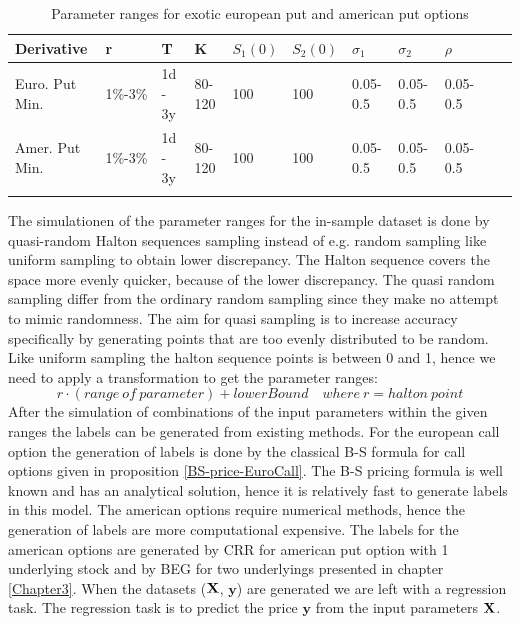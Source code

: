 \begin{table}[th]
\caption[Parameter Ranges For MLPs]{Parameter ranges for exotic european put and american put options}
\label{tab:ExoticParRange}
\centering
\begin{tabular}{l l l l l l l l l l l}
\toprule
\textbf{Derivative} & \textbf{r} & \textbf{T} & K & $S_1(0)$ & $S_2(0)$ & $\sigma_1$ & $\sigma_2$ & $\rho$ \\
\midrule
Euro. Put Min. & 1\%-3\% & 1d - 3y & 80-120 & 100 & 100 & 0.05-0.5 & 0.05-0.5 & 0.05-0.5\\ 
Amer. Put Min. & 1\%-3\% & 1d - 3y & 80-120 & 100 & 100 & 0.05-0.5 & 0.05-0.5 & 0.05-0.5\\
\bottomrule\\
\end{tabular}
\end{table}

The simulationen of the parameter ranges for the in-sample dataset is done by quasi-random Halton sequences sampling instead of e.g. random sampling like uniform sampling to obtain lower discrepancy. The Halton sequence covers the space more evenly quicker, because of the lower discrepancy. The quasi random sampling differ from the ordinary random sampling since they make no attempt to mimic randomness. The aim for quasi sampling is to increase accuracy specifically by generating points that are too evenly distributed to be random. Like uniform sampling the halton sequence points is between 0 and 1, hence we need to apply a transformation to get the parameter ranges:
$$r \cdot (range \ of \ parameter) + lowerBound \quad where \ r=halton \ point$$
After the simulation of combinations of the input parameters within the given ranges the labels can be generated from existing methods. For the european call option the generation of labels is done by the classical B-S formula for call options given in proposition \ref{BS-price-EuroCall}. The B-S pricing formula is well known and has an analytical solution, hence it is relatively fast to generate labels in this model. The american options require numerical methods, hence the generation of labels are more computational expensive. The labels for the american options are generated by CRR for american put option with 1 underlying stock and by BEG for two underlyings presented in chapter \ref{Chapter3}. When the datasets ($\mathbf{X}$, $\bm{y}$) are generated we are left with a regression task. The regression task is to predict the price $\bm{y}$ from the input parameters $\mathbf{X}$.\\ 

